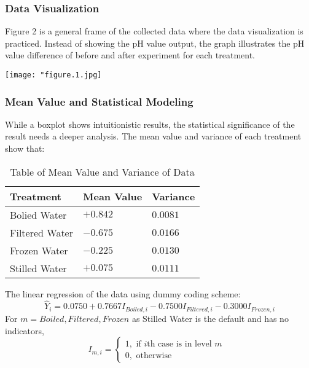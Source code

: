 \documentclass[12pt,]{article}
\let\origfigure\figure
\let\endorigfigure\endfigure
\renewenvironment{figure}[1][2] {
    \expandafter\origfigure\expandafter[H]
} {
    \endorigfigure
}
\begin{document}
\hypertarget{data-visualization}{%
\subsubsection{Data Visualization}\label{data-visualization}}

Figure 2 is a general frame of the collected data where the data
visualization is practiced. Instead of showing the pH value output, the
graph illustrates the pH value difference of before and after experiment
for each treatment.

\begin{figure}
  \centering
  \texttt{[image: "figure.1.jpg]}
  \caption{Boxplot of Difference in pH per Water Processing Method}
\end{figure}

\hypertarget{mean-value-and-statistical-modeling}{%
\subsubsection{Mean Value and Statistical
Modeling}\label{mean-value-and-statistical-modeling}}

While a boxplot shows intuitionistic results, the statistical
significance of the result needs a deeper analysis. The mean value and
variance of each treatment show that:

\begin{table}[H]
\caption{Table of Mean Value and Variance of Data}
\vspace{5pt}
\centering
\begin{tabular}{ |p{3cm}||p{3cm}|p{3cm}| }
 \hline
 Treatment& Mean Value & Variance \\
 \hline
 Bolied Water   & $+0.842$    & $0.0081$\\
 Filtered Water &   $-0.675$  & $0.0166$   \\
 Frozen Water &$-0.225$ & $0.0130$\\
 Stilled Water    &$+0.075$ & $0.0111$\\
 \hline
\end{tabular}
\end{table}

The linear regression of the data using dummy coding scheme:
\[\hat{Y}_i=0.0750+0.7667I_{Boiled,i}-0.7500I_{Filtered,i}-0.3000I_{Frozen,i}\]
For \(m=Boiled, Filtered, Frozen\) as Stilled Water is the default and
has no indicators, \[
I_{m,i}=
\begin{cases}
1, \text{ if $i$th case is in level $m$ }\\
0, \text{ otherwise}
\end{cases}
\]
\end{document}
